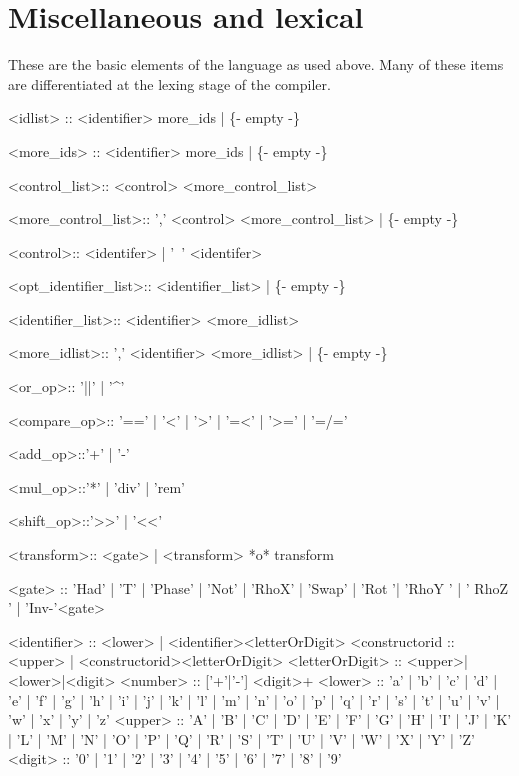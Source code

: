 \section{Miscellaneous and lexical}\label{sec:bnfMiscLexicalDefinition}
These are the basic elements of the language as used above. Many of these
items are differentiated at the lexing stage of the compiler.

\begin{singlespace}
\begin{bnf}   

   <idlist> :: <identifier> more_ids
        | \{- empty -\}
 
   <more_ids> :: <identifier> more_ids
        | \{- empty -\}
 
   <control_list>:: <control> <more_control_list>

   <more_control_list>:: ',' <control> <more_control_list>
        | \{- empty -\}
  
   <control>:: <identifer>   | '~' <identifer>

   <opt_identifier_list>:: <identifier_list>
        | \{- empty -\}
        
   <identifier_list>:: <identifier> <more_idlist>

   <more_idlist>:: ',' <identifier> <more_idlist> 
        | \{- empty -\}
  
   <or_op>:: '||' | '^'
  
   <compare_op>:: '==' | '<' | '>' | '=<' | '>=' | '=/=' 

   <add_op>::'+' | '-' 

   <mul_op>::'*' | 'div'  | 'rem'

   <shift_op>::'>>' | '<<'

   <transform>:: <gate> 
        | <transform> *o* transform 

   <gate> :: 'Had' | 'T'  | 'Phase' | 'Not' |  'RhoX'  
	| 'Swap' | 'Rot '| 'RhoY ' | '  RhoZ ' | 'Inv-'<gate>

   <identifier> :: <lower> | <identifier><letterOrDigit>
   <constructorid :: <upper> | <constructorid><letterOrDigit>
   <letterOrDigit> :: <upper>|<lower>|<digit>
   <number> :: ['+'|'-'] <digit>+
   <lower> ::   'a' | 'b' | 'c' | 'd' | 'e' | 'f' | 'g' 
        | 'h' | 'i' | 'j' | 'k' | 'l' | 'm' | 'n' | 'o' 
        | 'p' | 'q' | 'r' | 's' | 't' | 'u' | 'v' | 'w' 
	| 'x' | 'y' | 'z'
   <upper> ::   'A' | 'B' | 'C' | 'D' | 'E' | 'F' | 'G' 
        | 'H' | 'I' | 'J' | 'K' | 'L' | 'M' | 'N' | 'O' 
        | 'P' | 'Q' | 'R' | 'S' | 'T' | 'U' | 'V' | 'W' 
        | 'X' | 'Y' | 'Z'
   <digit> ::   '0' | '1' | '2' | '3' | '4' | '5' | '6' 
        | '7' | '8' | '9'
\end{bnf}
\end{singlespace}
